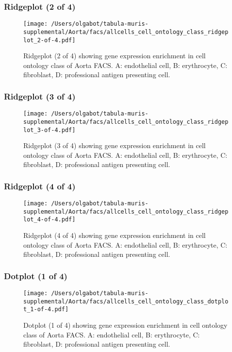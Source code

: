 \clearpage
\clearpage
\subsubsection{Ridgeplot (2 of 4)}
\begin{figure}[h]
\centering
\texttt{[image: /Users/olgabot/tabula-muris-supplemental/Aorta/facs/allcells\_cell\_ontology\_class\_ridgeplot\_2-of-4.pdf]}

\caption{ Ridgeplot (2 of 4)  showing gene expression enrichment in cell ontology class of Aorta FACS. A: endothelial cell, B: erythrocyte, C: fibroblast, D: professional antigen presenting cell.}
\end{figure}


\clearpage
\clearpage
\subsubsection{Ridgeplot (3 of 4)}
\begin{figure}[h]
\centering
\texttt{[image: /Users/olgabot/tabula-muris-supplemental/Aorta/facs/allcells\_cell\_ontology\_class\_ridgeplot\_3-of-4.pdf]}

\caption{ Ridgeplot (3 of 4)  showing gene expression enrichment in cell ontology class of Aorta FACS. A: endothelial cell, B: erythrocyte, C: fibroblast, D: professional antigen presenting cell.}
\end{figure}


\clearpage
\clearpage
\subsubsection{Ridgeplot (4 of 4)}
\begin{figure}[h]
\centering
\texttt{[image: /Users/olgabot/tabula-muris-supplemental/Aorta/facs/allcells\_cell\_ontology\_class\_ridgeplot\_4-of-4.pdf]}

\caption{ Ridgeplot (4 of 4)  showing gene expression enrichment in cell ontology class of Aorta FACS. A: endothelial cell, B: erythrocyte, C: fibroblast, D: professional antigen presenting cell.}
\end{figure}


\clearpage
\clearpage
\subsubsection{Dotplot (1 of 4)}
\begin{figure}[h]
\centering
\texttt{[image: /Users/olgabot/tabula-muris-supplemental/Aorta/facs/allcells\_cell\_ontology\_class\_dotplot\_1-of-4.pdf]}

\caption{ Dotplot (1 of 4)  showing gene expression enrichment in cell ontology class of Aorta FACS. A: endothelial cell, B: erythrocyte, C: fibroblast, D: professional antigen presenting cell.}
\end{figure}


